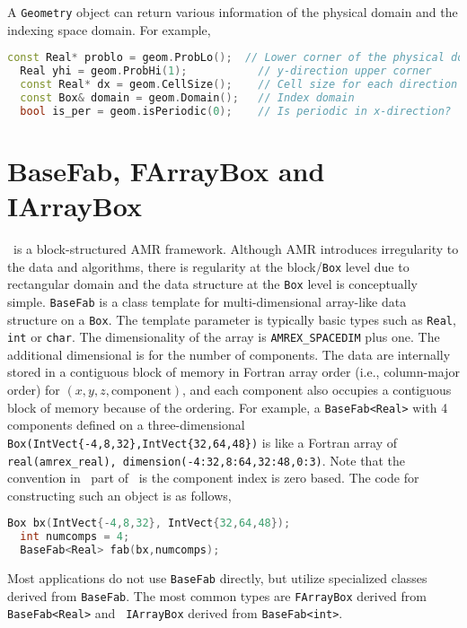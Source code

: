 A {\tt Geometry} object can return various information of the physical
domain and the indexing space domain.  For example,
\begin{lstlisting}[language=cpp]
  const Real* problo = geom.ProbLo();  // Lower corner of the physical domain
  Real yhi = geom.ProbHi(1);           // y-direction upper corner
  const Real* dx = geom.CellSize();    // Cell size for each direction
  const Box& domain = geom.Domain();   // Index domain
  bool is_per = geom.isPeriodic(0);    // Is periodic in x-direction?
\end{lstlisting}


\section{BaseFab, FArrayBox and IArrayBox}

\amrex\ is a block-structured AMR framework.  Although AMR introduces
irregularity to the data and algorithms, there is regularity at the
block/{\tt Box} level due to rectangular domain and the data structure
at the {\tt Box} level is conceptually simple.  {\tt BaseFab} is a
class template for multi-dimensional array-like data structure on a
{\tt Box}.  The template parameter is typically basic types such as
{\tt Real}, {\tt int} or {\tt char}.  The dimensionality of the array
is {\tt AMREX\_SPACEDIM} plus one.  The additional dimensional is for
the number of components.  The data are internally stored in a
contiguous block of memory in Fortran array order (i.e., column-major
order) for $(x,y,z,\mathrm{component})$, and each component also
occupies a contiguous block of memory because of the ordering.  For
example, a {\tt BaseFab<Real>} with 4 components defined on a
three-dimensional {\tt Box(IntVect\{-4,8,32\},IntVect\{32,64,48\})} is
like a Fortran array of {\tt real(amrex\_real),
  dimension(-4:32,8:64,32:48,0:3)}.  Note that the convention in \cpp\
part of \amrex\ is the component index is zero based.  The code for
constructing such an object is as follows,
\begin{lstlisting}[language=cpp]
  Box bx(IntVect{-4,8,32}, IntVect{32,64,48});
  int numcomps = 4;
  BaseFab<Real> fab(bx,numcomps);
\end{lstlisting}

Most applications do not use {\tt BaseFab} directly, but utilize
specialized classes derived from {\tt BaseFab}.  The most common types
are {\tt FArrayBox} derived from {\tt BaseFab<Real>} and {\tt
  IArrayBox} derived from {\tt BaseFab<int>}.

